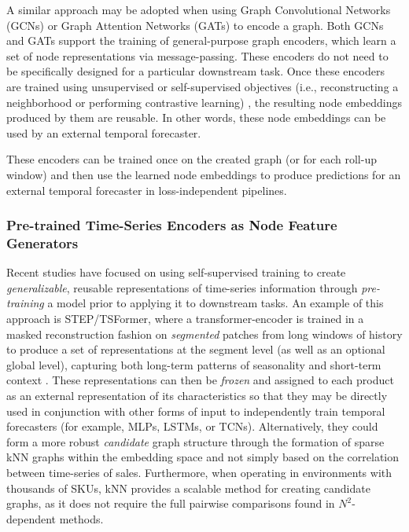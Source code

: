 A similar approach may be adopted when using Graph Convolutional Networks (\acp{GCN}) \cite{kipf2017semi} or Graph Attention Networks (\acp{GAT}) \cite{velickovic2018graph} to encode a graph. Both \acp{GCN} and \acp{GAT} support the training of general-purpose graph encoders, which learn a set of node representations via message-passing. These encoders do not need to be specifically designed for a particular downstream task. Once these encoders are trained using unsupervised or self-supervised objectives (i.e., reconstructing a neighborhood or performing contrastive learning) \cite{velickovic2019deep, zhu2020deep}, the resulting node embeddings produced by them are reusable. In other words, these node embeddings can be used by an external temporal forecaster.

These encoders can be trained once on the created graph (or for each roll-up window) and then use the learned node embeddings to produce predictions for an external temporal forecaster in loss-independent pipelines.

\subsubsection{Pre-trained Time-Series Encoders as Node Feature Generators}
Recent studies have focused on using self-supervised training to create \emph{generalizable}, reusable representations of time-series information through \emph{pre-training} a model prior to applying it to downstream tasks. An example of this approach is STEP/TSFormer, where a transformer-encoder is trained in a masked reconstruction fashion on \emph{segmented} patches from long windows of history to produce a set of representations at the segment level (as well as an optional global level), capturing both long-term patterns of seasonality and short-term context \cite{10.1145/3534678.3539396}. These representations can then be \emph{frozen} and assigned to each product as an external representation of its characteristics so that they may be directly used in conjunction with other forms of input to independently train temporal forecasters (for example, \acp{MLP}, \acp{LSTM}, or \acp{TCN}). Alternatively, they could form a more robust \emph{candidate} graph structure through the formation of sparse kNN graphs within the embedding space and not simply based on the correlation between time-series of sales. Furthermore, when operating in environments with thousands of \acp{SKU}, kNN provides a scalable method for creating candidate graphs, as it does not require the full pairwise comparisons found in $N^2$-dependent methods.

